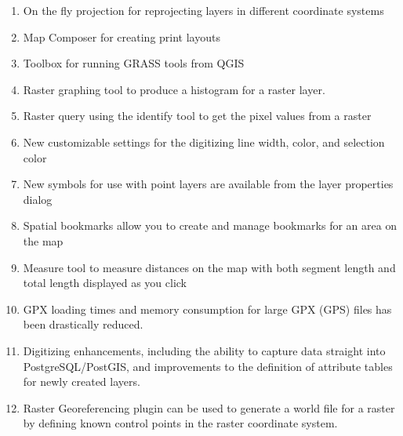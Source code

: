 \begin{enumerate}
  \item On the fly projection for reprojecting layers in different coordinate systems
  \item Map Composer for creating print layouts
  \item Toolbox for running GRASS tools from QGIS
  \item Raster graphing tool to produce a histogram for a raster layer.
  \item Raster query using the identify tool to get the pixel values from a raster 
  \item New customizable settings for the digitizing line width, color, and selection color  
  \item New symbols for use with point layers are available from the layer properties dialog 
  \item Spatial bookmarks allow you to create and manage bookmarks for an area on the map
  \item Measure tool to measure distances on the map with both
  segment length and total length displayed as you click
  \item GPX loading times and memory consumption for large GPX (GPS) files
  has been drastically reduced.  
  \item Digitizing enhancements, including the ability to capture data straight
  into PostgreSQL/PostGIS, and improvements to the definition of attribute tables
  for newly created layers.
  \item Raster Georeferencing plugin can be used
  to generate a world file for a raster by defining known
  control points in the raster coordinate system.
\end{enumerate}

